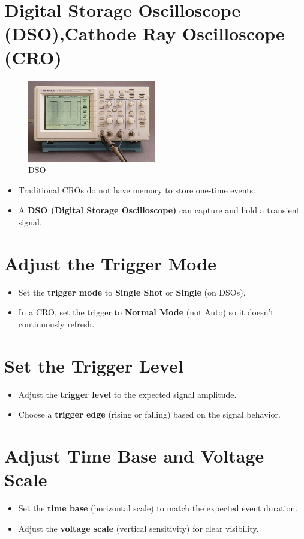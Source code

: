 \documentclass{article}
\begin{document}
\section{Digital Storage Oscilloscope (DSO),Cathode Ray Oscilloscope (CRO)}
\begin{figure}[H]
\centering
\includegraphics[width=0.5\textwidth]{figs/dso.png}
\caption{DSO}
\end{figure}

\begin{itemize}
    \item Traditional CROs do not have memory to store one-time events.
    \item A \textbf{DSO (Digital Storage Oscilloscope)} can capture and hold a transient signal.
\end{itemize}

\section{Adjust the Trigger Mode}
\begin{itemize}
    \item Set the \textbf{trigger mode} to \textbf{Single Shot} or \textbf{Single} (on DSOs).
    \item In a CRO, set the trigger to \textbf{Normal Mode} (not Auto) so it doesn't continuously refresh.
\end{itemize}

\section{Set the Trigger Level}
\begin{itemize}
    \item Adjust the \textbf{trigger level} to the expected signal amplitude.
    \item Choose a \textbf{trigger edge} (rising or falling) based on the signal behavior.
\end{itemize}

\section{Adjust Time Base and Voltage Scale}
\begin{itemize}
    \item Set the \textbf{time base} (horizontal scale) to match the expected event duration.
    \item Adjust the \textbf{voltage scale} (vertical sensitivity) for clear visibility.
\end{itemize}
\end{document}
